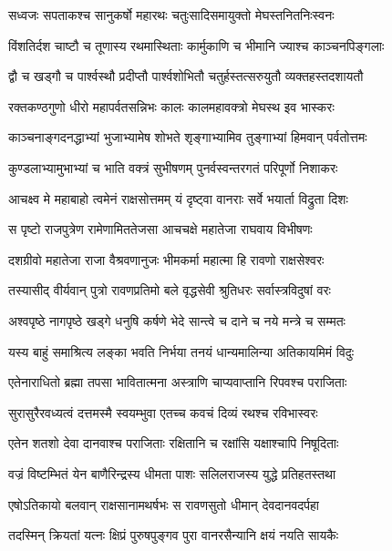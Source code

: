 \twolineshloka
{सध्वजः सपताकश्च सानुकर्षो महारथः}
{चतुःसादिसमायुक्तो मेघस्तनितनिःस्वनः} %

\twolineshloka
{विंशतिर्दश चाष्टौ च तूणास्य रथमास्थिताः}
{कार्मुकाणि च भीमानि ज्याश्च काञ्चनपिङ्गलाः} %

\twolineshloka
{द्वौ च खड्गौ च पार्श्वस्थौ प्रदीप्तौ पार्श्वशोभितौ}
{चतुर्हस्तत्सरुयुतौ व्यक्तहस्तदशायतौ} %

\twolineshloka
{रक्तकण्ठगुणो धीरो महापर्वतसन्निभः}
{कालः कालमहावक्त्रो मेघस्थ इव भास्करः} %

\twolineshloka
{काञ्चनाङ्गदनद्धाभ्यां भुजाभ्यामेष शोभते}
{शृङ्गाभ्यामिव तुङ्गाभ्यां हिमवान् पर्वतोत्तमः} %

\twolineshloka
{कुण्डलाभ्यामुभाभ्यां च भाति वक्त्रं सुभीषणम्}
{पुनर्वस्वन्तरगतं परिपूर्णो निशाकरः} %

\twolineshloka
{आचक्ष्व मे महाबाहो त्वमेनं राक्षसोत्तमम्}
{यं दृष्ट्वा वानराः सर्वे भयार्ता विद्रुता दिशः} %

\twolineshloka
{स पृष्टो राजपुत्रेण रामेणामिततेजसा}
{आचचक्षे महातेजा राघवाय विभीषणः} %

\twolineshloka
{दशग्रीवो महातेजा राजा वैश्रवणानुजः}
{भीमकर्मा महात्मा हि रावणो राक्षसेश्वरः} %

\twolineshloka
{तस्यासीद् वीर्यवान् पुत्रो रावणप्रतिमो बले}
{वृद्धसेवी श्रुतिधरः सर्वास्त्रविदुषां वरः} %

\twolineshloka
{अश्वपृष्ठे नागपृष्ठे खड्गे धनुषि कर्षणे}
{भेदे सान्त्वे च दाने च नये मन्त्रे च सम्मतः} %

\twolineshloka
{यस्य बाहुं समाश्रित्य लङ्का भवति निर्भया}
{तनयं धान्यमालिन्या अतिकायमिमं विदुः} %

\twolineshloka
{एतेनाराधितो ब्रह्मा तपसा भावितात्मना}
{अस्त्राणि चाप्यवाप्तानि रिपवश्च पराजिताः} %

\twolineshloka
{सुरासुरैरवध्यत्वं दत्तमस्मै स्वयम्भुवा}
{एतच्च कवचं दिव्यं रथश्च रविभास्वरः} %

\twolineshloka
{एतेन शतशो देवा दानवाश्च पराजिताः}
{रक्षितानि च रक्षांसि यक्षाश्चापि निषूदिताः} %

\twolineshloka
{वज्रं विष्टम्भितं येन बाणैरिन्द्रस्य धीमता}
{पाशः सलिलराजस्य युद्धे प्रतिहतस्तथा} %

\twolineshloka
{एषोऽतिकायो बलवान् राक्षसानामथर्षभः}
{स रावणसुतो धीमान् देवदानवदर्पहा} %

\twolineshloka
{तदस्मिन् क्रियतां यत्नः क्षिप्रं पुरुषपुङ्गव}
{पुरा वानरसैन्यानि क्षयं नयति सायकैः} %

